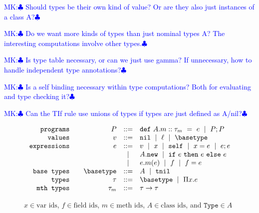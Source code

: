 \documentclass{article}
\def\spmid{\ \mid \ }
\def\MK#1{\textcolor{blue}{\sf MK:$\clubsuit$ #1$\clubsuit$}}
\newcommand\val{\ensuremath{v}\xspace}
\newcommand\expr{\ensuremath{e}\xspace}
\newcommand\prog{\ensuremath{P}\xspace}
\newcommand\type{\tau}
\newcommand\deptype{\ensuremath{\Pi\var.\expr}}
\newcommand\methtype{\type_m}
\newcommand\pdef[3]{\ensuremath{\texttt{def}\ #1::#2\ =\ #3}\xspace}
\newcommand\var{\ensuremath{x}\xspace}
\newcommand\tnil{\texttt{tnil}\xspace}
\newcommand\vnil{\texttt{nil}\xspace}
\newcommand\eseq[2]{\ensuremath{#1 ; #2}\xspace}
\newcommand\eassn[2]{\ensuremath{#1 = #2}\xspace}
\newcommand\eif[3]{\ensuremath{\texttt{if}\ #1\ \texttt{then}\ #2\ \texttt{else}\ #3}\xspace}
\newcommand\eself{\texttt{self}\xspace}
\newcommand\emethcall[3]{\ensuremath{#1.#2(#3)}\xspace}
\newcommand\efield{\ensuremath{f}\xspace}
\newcommand\efieldassn[1]{\ensuremath{\efield = #1}\xspace}
\newcommand\enew[1]{\ensuremath{#1 . \texttt{new}}\xspace}
\newcommand\mthtype[2]{\ensuremath{#1 \rightarrow #2}\xspace}
\begin{document}
\MK{Should types be their own kind of value? Or are they also just instances of a class A?}

\MK{Do we want more kinds of types than just nominal types A? The interesting computations involve other types.}

\MK{Is type table necessary, or can we just use gamma? If unnecessary, how to handle independent type annotations?}

\MK{Is a self binding necessary within type computations? Both for evaluating and type checking it?}

\MK{Can the TIf rule use unions of types if types are just defined as A/nil?}
\begin{figure}[t!]
\centering
$$
\begin{array}{rrcl}

\texttt{programs} \quad
& \prog
& ::= & \pdef{A.m}{\methtype}{\expr} \spmid \prog ; \prog
\\

\texttt{values} \quad
& \val
& ::= & \vnil \spmid \ell \spmid \basetype
\\%

\texttt{expressions} \quad
& \expr
& ::= & \val \spmid \var \spmid \eself \spmid \eassn{\var}{\expr} \spmid \eseq{\expr}{\expr} \\
&     & \spmid & \enew{A} \spmid \eif{\expr}{\expr}{\expr}\\ 
&     & \spmid & \emethcall{e}{m}{e} \spmid \efield \spmid \efieldassn{\expr}
\\

\texttt{base types} \quad
& \basetype
& ::= & A \spmid \tnil\\

\texttt{types} \quad
& \type
& ::= & \basetype \spmid  \deptype \\%

\texttt{mth types} \quad
& \methtype
& ::= & \mthtype{\tau}{\tau}
\end{array}
$$

  $x\in\textrm{var ids}$, $\efield\in\textrm{field ids}$, $m\in\textrm{meth ids}$, $A\in\textrm{class ids}$, and $\texttt{Type}\in A$
\end{figure}
\end{document}
